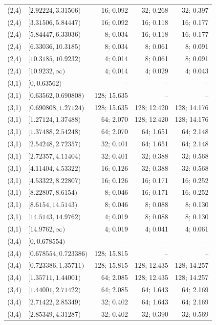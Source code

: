 {\begin{longtable}{@{}llrrr@{}}
(2,4) & $[2.92224,3.31506)$ & 16; 0.092 & 32; 0.268 & 32; 0.397 \\
(2,4) & $[3.31506,5.84447)$ & 16; 0.092 & 16; 0.118 & 16; 0.177 \\
(2,4) & $[5.84447,6.33036)$ & 8; 0.034 & 16; 0.118 & 16; 0.177 \\
(2,4) & $[6.33036,10.3185)$ & 8; 0.034 & 8; 0.061 & 8; 0.091 \\
(2,4) & $[10.3185,10.9232)$ & 4; 0.014 & 8; 0.061 & 8; 0.091 \\
(2,4) & $[10.9232,\infty)$ & 4; 0.014 & 4; 0.029 & 4; 0.043 \\
(3,1) & $[0,0.63562)$ & -- & -- & -- \\
(3,1) & $[0.63562,0.690808)$ & 128; 15.635 & -- & -- \\
(3,1) & $[0.690808,1.27124)$ & 128; 15.635 & 128; 12.420 & 128; 14.176 \\
(3,1) & $[1.27124,1.37488)$ & 64; 2.070 & 128; 12.420 & 128; 14.176 \\
(3,1) & $[1.37488,2.54248)$ & 64; 2.070 & 64; 1.651 & 64; 2.148 \\
(3,1) & $[2.54248,2.72357)$ & 32; 0.401 & 64; 1.651 & 64; 2.148 \\
(3,1) & $[2.72357,4.11404)$ & 32; 0.401 & 32; 0.388 & 32; 0.568 \\
(3,1) & $[4.11404,4.53322)$ & 16; 0.126 & 32; 0.388 & 32; 0.568 \\
(3,1) & $[4.53322,8.22807)$ & 16; 0.126 & 16; 0.171 & 16; 0.252 \\
(3,1) & $[8.22807,8.6154)$ & 8; 0.046 & 16; 0.171 & 16; 0.252 \\
(3,1) & $[8.6154,14.5143)$ & 8; 0.046 & 8; 0.088 & 8; 0.130 \\
(3,1) & $[14.5143,14.9762)$ & 4; 0.019 & 8; 0.088 & 8; 0.130 \\
(3,1) & $[14.9762,\infty)$ & 4; 0.019 & 4; 0.041 & 4; 0.061 \\
(3,4) & $[0,0.678554)$ & -- & -- & -- \\
(3,4) & $[0.678554,0.723386)$ & 128; 15.815 & -- & -- \\
(3,4) & $[0.723386,1.35711)$ & 128; 15.815 & 128; 12.435 & 128; 14.257 \\
(3,4) & $[1.35711,1.44001)$ & 64; 2.085 & 128; 12.435 & 128; 14.257 \\
(3,4) & $[1.44001,2.71422)$ & 64; 2.085 & 64; 1.643 & 64; 2.169 \\
(3,4) & $[2.71422,2.85349)$ & 32; 0.402 & 64; 1.643 & 64; 2.169 \\
(3,4) & $[2.85349,4.31287)$ & 32; 0.402 & 32; 0.390 & 32; 0.569 \\

\end{longtable}}
